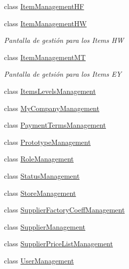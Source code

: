 \begin{DoxyCompactItemize}
class \mbox{\hyperlink{class_h_k_supply_1_1_forms_1_1_master_1_1_item_management_h_f}{Item\+Management\+HF}}
\item 
class \mbox{\hyperlink{class_h_k_supply_1_1_forms_1_1_master_1_1_item_management_h_w}{Item\+Management\+HW}}
\begin{DoxyCompactList}\small\item\em Pantalla de gestión para los Items HW \end{DoxyCompactList}\item 
class \mbox{\hyperlink{class_h_k_supply_1_1_forms_1_1_master_1_1_item_management_m_t}{Item\+Management\+MT}}
\begin{DoxyCompactList}\small\item\em Pantalla de getsión para los Items EY \end{DoxyCompactList}\item 
class \mbox{\hyperlink{class_h_k_supply_1_1_forms_1_1_master_1_1_items_levels_management}{Items\+Levels\+Management}}
\item 
class \mbox{\hyperlink{class_h_k_supply_1_1_forms_1_1_master_1_1_my_company_management}{My\+Company\+Management}}
\item 
class \mbox{\hyperlink{class_h_k_supply_1_1_forms_1_1_master_1_1_payment_terms_management}{Payment\+Terms\+Management}}
\item 
class \mbox{\hyperlink{class_h_k_supply_1_1_forms_1_1_master_1_1_prototype_management}{Prototype\+Management}}
\item 
class \mbox{\hyperlink{class_h_k_supply_1_1_forms_1_1_master_1_1_role_management}{Role\+Management}}
\item 
class \mbox{\hyperlink{class_h_k_supply_1_1_forms_1_1_master_1_1_status_management}{Status\+Management}}
\item 
class \mbox{\hyperlink{class_h_k_supply_1_1_forms_1_1_master_1_1_store_management}{Store\+Management}}
\item 
class \mbox{\hyperlink{class_h_k_supply_1_1_forms_1_1_master_1_1_supplier_factory_coeff_management}{Supplier\+Factory\+Coeff\+Management}}
\item 
class \mbox{\hyperlink{class_h_k_supply_1_1_forms_1_1_master_1_1_supplier_management}{Supplier\+Management}}
\item 
class \mbox{\hyperlink{class_h_k_supply_1_1_forms_1_1_master_1_1_supplier_price_list_management}{Supplier\+Price\+List\+Management}}
\item 
class \mbox{\hyperlink{class_h_k_supply_1_1_forms_1_1_master_1_1_user_management}{User\+Management}}
\end{DoxyCompactItemize}
